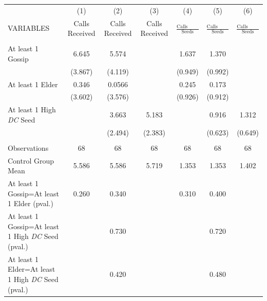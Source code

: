 \begin{tabular}{lcccccc} \hline
 & (1) & (2) & (3) & (4) & (5) & (6) \\
VARIABLES & Calls Received & Calls Received & Calls Received & $\frac{\mbox{Calls Received}}{\mbox{Seeds}}$ & $\frac{\mbox{Calls Received}}{\mbox{Seeds}}$ & $\frac{\mbox{Calls Received}}{\mbox{Seeds}}$ \\ \hline
 &  &  &  &  &  &  \\
At least 1 Gossip & 6.645 & 5.574 &  & 1.637 & 1.370 &  \\
 & (3.867) & (4.119) &  & (0.949) & (0.992) &  \\
At least 1 Elder & 0.346 & 0.0566 &  & 0.245 & 0.173 &  \\
 & (3.602) & (3.576) &  & (0.926) & (0.912) &  \\
At least 1 High \textit{DC} Seed &  & 3.663 & 5.183 &  & 0.916 & 1.312 \\
 &  & (2.494) & (2.383) &  & (0.623) & (0.649) \\
 &  &  &  &  &  &  \\
Observations & 68 & 68 & 68 & 68 & 68 & 68 \\
Control Group Mean & 5.586 & 5.586 & 5.719 & 1.353 & 1.353 & 1.402 \\
At least 1 Gossip=At least 1 Elder (pval.) & 0.260 & 0.340 &  & 0.310 & 0.400 &  \\
At least 1 Gossip=At least 1 High \textit{DC} Seed (pval.) &  & 0.730 &  &  & 0.720 &  \\
 At least 1 Elder=At least 1 High \textit{DC} Seed (pval.) &  & 0.420 &  &  & 0.480 &  \\ \hline
\end{tabular}
